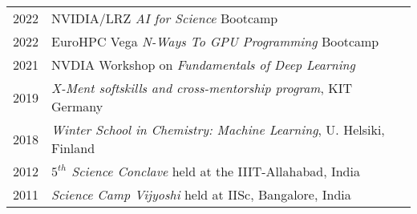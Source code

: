 \begin{tabular}{ll}
	2022 & NVIDIA/LRZ \textit{AI for Science} Bootcamp \\
	2022 & EuroHPC Vega \textit{N-Ways To GPU Programming} Bootcamp \\
	2021 & NVDIA Workshop on \textit{Fundamentals of Deep Learning} \\
	2019 & \textit{X-Ment softskills and cross-mentorship program}, KIT Germany\\
	2018 & \textit{Winter School in Chemistry: Machine Learning}, U. Helsiki, Finland \\
	2012 & \textit{$5^{th}$ Science Conclave} held at the IIIT-Allahabad, India \\
	2011 & \textit{Science Camp Vijyoshi} held at IISc, Bangalore, India \\
\end{tabular}